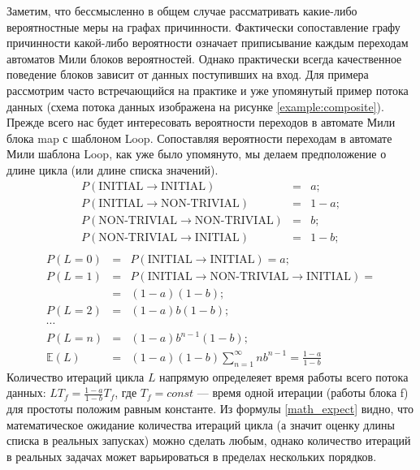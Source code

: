 \documentclass[10pt,a4paper]{article}
\newcommand{\initial}{\text{INITIAL}}
\newcommand{\nontrivial}{\text{NON-TRIVIAL}}
\begin{document}
  Заметим, что бессмысленно в общем случае рассматривать какие-либо вероятностные меры на графах причинности. Фактически сопоставление графу причинности
  какой-либо вероятности означает приписывание каждым переходам автоматов Мили блоков вероятностей. Однако практически всегда качественное поведение блоков зависит
  от данных поступивших на вход. Для примера рассмотрим часто встречающийся на практике и уже упомянутый пример потока данных
  (схема потока данных изображена на рисунке \ref{example:composite}). Прежде всего нас будет интересовать вероятности переходов в автомате Мили блока map с шаблоном Loop.
  Сопоставляя вероятности переходам в автомате Мили шаблона Loop, как уже было упомянуто, мы делаем предположение о длине цикла (или длине списка значений).
  \begin{eqnarray*}
    P(\initial \rightarrow \initial) & = & a; \\
    P(\initial \rightarrow \nontrivial) & = & 1 - a; \\
    P(\nontrivial \rightarrow \nontrivial) & = & b; \\
    P(\nontrivial \rightarrow \initial) & = & 1 - b; \\
  \end{eqnarray*}
  \begin{eqnarray*}  
    P(L = 0) & = & P(\initial \rightarrow \initial) = a; \\
    P(L = 1) & = & P(\initial \rightarrow \nontrivial \rightarrow \initial) = \\
             & = & (1 - a) (1 - b); \\
    P(L = 2) & = & (1 - a) b (1 - b); \\
    \cdots & & \\
    P(L = n) & = & (1 - a) b^{n - 1} (1 - b);\\
    \mathbb{E}(L) & = & (1 - a) (1 - b) \sum^{\infty}_{n = 1} n b^{n - 1} = \frac{1 - a}{1 - b} \label{math_expect}
  \end{eqnarray*}
  Количество итераций цикла $L$ напрямую определеяет время работы всего потока данных: $LT_f = \frac{1 - a}{1 - b} T_f$,
  где $T_f = const$ --- время одной итерации (работы блока f) для простоты положим равным константе.
  Из формулы \ref{math_expect} видно, что математическое ожидание количества итераций цикла
  (а значит оценку длины списка в реальных запусках) можно сделать любым, однако количество итераций в реальных задачах может варьироваться в пределах нескольких порядков.
  
\end{document}
